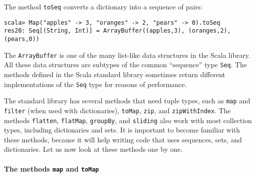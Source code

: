 The method \lstinline!toSeq! converts a dictionary into a sequence
of pairs:
\begin{lstlisting}
scala> Map("apples" -> 3, "oranges" -> 2, "pears" -> 0).toSeq
res20: Seq[(String, Int)] = ArrayBuffer((apples,3), (oranges,2), (pears,0))
\end{lstlisting}
The \lstinline!ArrayBuffer! is one of the many list-like data structures
in the Scala library. All these data structures are subtypes of the
common \textsf{``}sequence\textsf{''} type \lstinline!Seq!. The methods defined in
the Scala standard library sometimes return different implementations
of the \lstinline!Seq! type for reasons of performance.

The standard library has several methods that need tuple types, such
as \lstinline!map! and \lstinline!filter! (when used with dictionaries),
\lstinline!toMap!, \lstinline!zip!, and \lstinline!zipWithIndex!.
The methods \lstinline!flatten!, \lstinline!flatMap!, \lstinline!groupBy!,
and \lstinline!sliding! also work with most collection types, including
dictionaries and sets. It is important to become familiar with these
methods, because it will help writing code that uses sequences, sets,
and dictionaries. Let us now look at these methods one by one.

\paragraph*{The methods \texttt{map} and \texttt{toMap}}


